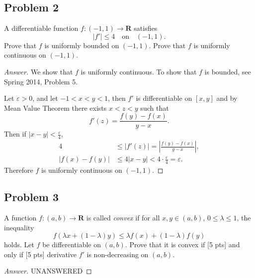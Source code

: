 \documentclass[12pt]{article}
\newcommand{\ita}[1]{\textit{#1}}
\newcommand{\abs}[1]{\left | #1 \right |}
\newcommand{\eps}{\varepsilon}
\theoremstyle{definition}
\begin{document}
\subsection{Problem 2}
A differentiable function $f : (-1,1) \to \mathbf{R}$ satisfies 
\[
    |f'| \leq 4 \quad \text{on} \quad (-1,1).
\]
Prove that $f$ is uniformly bounded on $(-1,1)$. Prove that $f$ is uniformly continuous on $(-1,1)$.
\begin{proof}[Answer]
    We show that $f$ is uniformly continuous. To show that $f$ is bounded, see Spring 2014, Problem 5.
    
    Let $\eps > 0$, and let $-1 < x < y < 1$, then $f'$ is differentiable on $[x,y]$ and by Mean Value Theorem there exists $x < z < y$ such that \[
        f'(z) = \frac{f(y) - f(x)}{y-x}.
    \]
    Then if $|x - y| < \frac{\eps}{4}$,
    \begin{align*}
        4 & \leq \abs{ f'(z) } = \abs{ \frac{f(y) - f(x)}{y-x} } , \\
        \abs{ f(x) - f(y) } & \leq 4 \abs{ x - y } < 4 \cdot \frac{\eps}{4} = \eps.
    \end{align*}
    Therefore $f$ is uniformly continuous on $(-1,1)$.
\end{proof}
\subsection{Problem 3}
A function $f : (a,b) \to \mathbf{R}$ is called \ita{convex} if for all $x,y \in (a,b)$, $0 \leq \lambda \leq 1$, the inequality
\[
    f(\lambda x + (1-\lambda)y) \leq \lambda f(x) + (1-\lambda) f(y)
\]
holds. Let $f$ be differentiable on $(a,b)$. Prove that it is convex if [5 pts] and only if [5 pts] derivative $f'$ is non-decreasing on $(a,b)$.
\begin{proof}[Answer]
    UNANSWERED
\end{proof}
\end{document}

